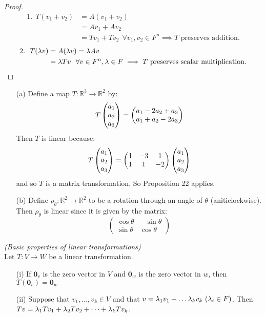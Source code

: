 \begin{proof}
\[
\begin{aligned}
1.~~ T(v_1 + v_2) &= A(v_1 + v_2)\\
&= Av_1 + Av_2 \\
&= Tv_1 + Tv_2~~ \forall v_1,v_2 \in F^n \implies T \text{ preserves addition.}
\end{aligned}\]
\[\begin{aligned}
2.~~ T(\lambda v) &= A(\lambda v) = \lambda A v \\
&= \lambda Tv ~~ \forall v \in F^n, \lambda \in F \implies T \text{ preserves scalar multiplication.}\qedhere
\end{aligned}
\]
\end{proof}

\begin{examples}
\begin{itemize}
\item[(a)] 
Define a map $T: \mathbb{R}^3 \to \mathbb{R}^2$ by:
\[
T\Spvek{a_1;a_2;a_3} = \Spvek{a_1 - 2a_2 + a_3; a_1 + a_2 - 2a_3}
\]
Then $T$ is linear because:
\[
T\Spvek{a_1;a_2;a_3} = \begin{pmatrix}
 1 & -3 & 1 \\ 1 & 1 & -2
 \end{pmatrix}
\Spvek{a_1;a_2;a_3}
\]
and so $T$ is a matrix transformation. So Proposition 22 applies.

\item[(b)] Define $\rho_{\theta}: \mathbb{R}^2 \to \mathbb{R}^2$ to be a rotation through an angle of $\theta$ (aniticlockwise). Then $\rho_{\theta}$ is linear since it is given by the matrix:\[
\begin{pmatrix}
\cos\theta & -\sin\theta \\ 
\sin\theta & \cos\theta
\end{pmatrix} \]

\end{itemize}
\end{examples}\vspace*{10pt}


\begin{proposition}\emph{(Basic properties of linear transformations)} \\

Let $T: V \to W$ be a linear transformation.

\begin{enumerate}
\item[(i)] If $\mathbf{0}_v$ is the zero vector in $V$ and $\mathbf{0}_w$ is the zero vector in $w$, then $T(\mathbf{0}_v) = \mathbf{0}_w$
\item[(ii)] Suppose that $v_1, \dots, v_k \in V$ and that $v = \lambda_1v_1 + \dots \lambda_kv_k ~(\lambda_i \in F)$. Then $Tv = \lambda_1Tv_1 + \lambda_2Tv_2 + \dots + \lambda_kTv_k$.
\end{enumerate}
\end{proposition}


